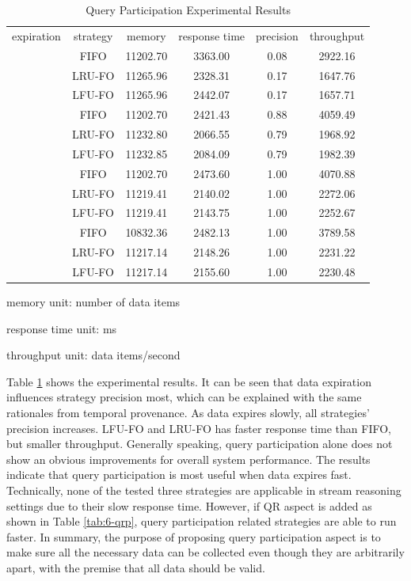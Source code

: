 \begin{table}[!htbp]
	\centering
    \caption{Query Participation Experimental Results}
    \label{tab:6-qpp}
    \begin{tabular}{|c||c||c|c|c|c|} \hline
    expiration & strategy & memory & response time & precision & throughput \\ \hhline{|=#=#=|=|=|=|}
    \multirow{3}{*}{quick} & FIFO   & 11202.70 & 3363.00 & 0.08 & 2922.16 \\ \cline{2-6} 
 					      & LRU-FO & 11265.96 & 2328.31 & 0.17 & 1647.76 \\ \cline{2-6} 
 					      & LFU-FO & 11265.96 & 2442.07 & 0.17 & 1657.71 \\ \hhline{|=#=#=|=|=|=|}
	\multirow{3}{*}{normal} & FIFO   & 11202.70 & 2421.43 & 0.88 & 4059.49 \\ \cline{2-6} 
 						    & LRU-FO & 11232.80 & 2066.55 & 0.79 & 1968.92 \\ \cline{2-6} 
 						    & LFU-FO & 11232.85 & 2084.09 & 0.79 & 1982.39 \\ \hhline{|=#=#=|=|=|=|}
	\multirow{3}{*}{slow} & FIFO & 11202.70   & 2473.60 & 1.00 & 4070.88 \\ \cline{2-6} 
					      & LRU-FO & 11219.41 & 2140.02 & 1.00 & 2272.06 \\ \cline{2-6} 
 					      & LFU-FO & 11219.41 & 2143.75 & 1.00 & 2252.67 \\ \hhline{|=#=#=|=|=|=|}
    \multirow{3}{*}{none} & FIFO & 10832.36 & 2482.13 & 1.00 & 3789.58 \\ \cline{2-6}
    					  & LRU-FO & 11217.14 & 2148.26 & 1.00 & 2231.22 \\ \cline{2-6}
                          & LFU-FO & 11217.14 & 2155.60 & 1.00 & 2230.48 \\ \hline
	\end{tabular}
    \begin{tablenotes}
 		\item memory unit: number of data items
 		\item response time unit: ms
 		\item throughput unit: data items/second
    \end{tablenotes}
\end{table}

Table \ref{tab:6-qpp} shows the experimental results. 
It can be seen that data expiration influences strategy precision most, which can be explained with the same rationales from temporal provenance. 
As data expires slowly, all strategies' precision increases. 
LFU-FO and LRU-FO has faster response time than FIFO, but smaller throughput. 
Generally speaking, query participation alone does not show an obvious improvements for overall system performance.
The results indicate that query participation is most useful when data expires fast.
Technically, none of the tested three strategies are applicable in stream reasoning settings due to their slow response time. 
However, if QR aspect is added as shown in Table \ref{tab:6-qrp}, query participation related strategies are able to run faster. 
In summary, the purpose of proposing query participation aspect is to make sure all the necessary data can be collected even though they are arbitrarily apart, with the premise that all data should be valid.
%
